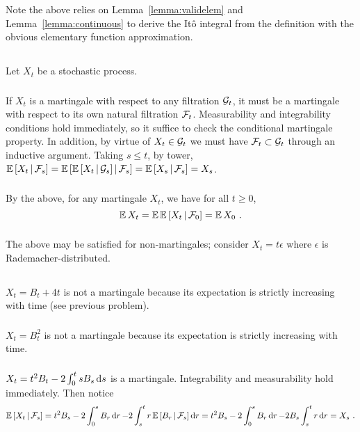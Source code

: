 \documentclass{article}
\begin{document}
Note the above relies on Lemma~\ref{lemma:validelem} and Lemma~\ref{lemma:continuous} to derive the It\^{o} integral from the definition with the obvious elementary function approximation.
  
  \subsection{}

  Let \(X_t\) be a stochastic process.
\subsubsection{}
If \(X_t\) is a martingale with respect to any filtration \(\mathcal{G}_t\), it must be a martingale with respect to its own natural filtration \(\mathcal{F}_t\). Measurability and integrability conditions hold immediately, so it suffice to check the conditional martingale property. In addition, by virtue of \(X_t\in \mathcal{G}_t\) we must have \(\mathcal{F}_t\subset\mathcal{G}_t\) through an inductive argument. Taking \(s\le t\), by tower, \(\operatorname{\mathbb{E}}\left[ X_t \,\middle|\, \mathcal{F}_s \right]=\operatorname{\mathbb{E}}\left[ \operatorname{\mathbb{E}}\left[ X_t \,\middle|\, \mathcal{G}_s \right] \,\middle|\, \mathcal{F}_s \right]=\operatorname{\mathbb{E}}\left[ X_s \,\middle|\, \mathcal{F}_s \right]=X_s\).
\subsubsection{}
By the above, for any martingale \(X_t\), we have for all \(t\ge 0\),
\[
  \operatorname{\mathbb{E}} X_t=\operatorname{\mathbb{E}}\operatorname{\mathbb{E}}\left[ X_t \,\middle|\, \mathcal{F}_0 \right]=\operatorname{\mathbb{E}} X_0\,\,.
\]
\subsubsection{}
The above may be satisfied for non-martingales; consider \(X_t=t\epsilon\) where \(\epsilon\) is Rademacher-distributed.
\subsection{}
\subsubsection{}
\(X_t=B_t+4t\) is not a martingale because its expectation is strictly increasing with time (see previous problem).
\subsubsection{}
\(X_t=B_t^2\) is not a martingale because its expectation is strictly increasing with time.
\subsubsection{}
\(X_t=t^2B_t-2\int_0^tsB_s\mathop{\mathrm{d} s }\) is a martingale. Integrability and measurability hold immediately. Then notice
\[
  \operatorname{\mathbb{E}}\left[ X_t \,\middle|\, \mathcal{F}_s \right]=t^2B_s-2\int_0^sB_r\mathop{\mathrm{d} r }-2\int_s^tr\operatorname{\mathbb{E}}\left[ B_r \,\middle|\, \mathcal{F}_s \right]\mathop{\mathrm{d} r }=t^2B_s-2\int_0^sB_r\mathop{\mathrm{d} r }-2B_s\int_s^tr\mathop{\mathrm{d} r }=X_s\,\,.
\]
\end{document}
